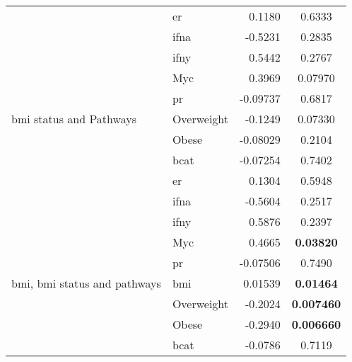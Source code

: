 \begin{table}[htpb]
\begin{threeparttable}
\begin{tabular}{llrc}
                                                                           & \gls{er}   & 0.1180   & 0.6333  \\
                                                                           & \gls{ifna} & -0.5231  & 0.2835  \\
                                                                           & \gls{ifny} & 0.5442   & 0.2767  \\
                                                                           & Myc        & 0.3969   & 0.07970 \\
                                                                           & \gls{pr}   & -0.09737 & 0.6817  \\
				\hline
				\rule{0pt}{2.25ex}\gls{bmi} status and Pathways            & Overweight & -0.1249  & 0.07330 \\
                                                                           & Obese      & -0.08029 & 0.2104  \\
                                                                           & \gls{bcat} & -0.07254 & 0.7402  \\
                                                                           & \gls{er}   & 0.1304   & 0.5948  \\
                                                                           & \gls{ifna} & -0.5604  & 0.2517  \\
                                                                           & \gls{ifny} & 0.5876   & 0.2397  \\
                                                                           & Myc        & 0.4665   & \bfseries 0.03820  \\
                                                                           & \gls{pr}   & -0.07506 & 0.7490  \\
				\hline
				\rule{0pt}{2.25ex}\gls{bmi}, \gls{bmi} status and pathways & \gls{bmi}  & 0.01539  & \bfseries 0.01464  \\
                                                                           & Overweight & -0.2024  & \bfseries 0.007460  \\
                                                                           & Obese      & -0.2940  & \bfseries 0.006660  \\
                                                                           & \gls{bcat} & -0.0786  & 0.7119 \\

\end{tabular}
\end{threeparttable}
\end{table}
